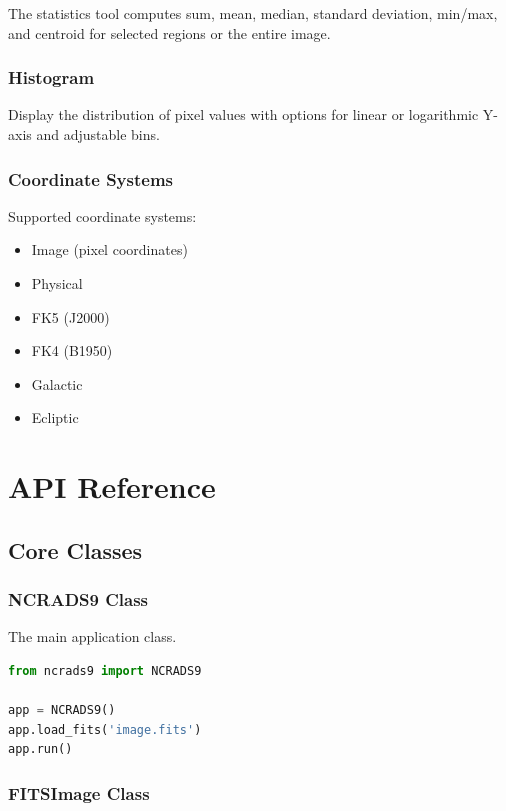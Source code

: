 \documentclass[11pt,a4paper]{report}
\begin{document}
The statistics tool computes sum, mean, median, standard deviation, min/max, and centroid for selected regions or the entire image.

\subsection{Histogram}

Display the distribution of pixel values with options for linear or logarithmic Y-axis and adjustable bins.

\subsection{Coordinate Systems}

Supported coordinate systems:
\begin{itemize}
    \item Image (pixel coordinates)
    \item Physical
    \item FK5 (J2000)
    \item FK4 (B1950)
    \item Galactic
    \item Ecliptic
\end{itemize}

\chapter{API Reference}

\section{Core Classes}

\subsection{NCRADS9 Class}

The main application class.

\begin{lstlisting}[language=Python]
from ncrads9 import NCRADS9

app = NCRADS9()
app.load_fits('image.fits')
app.run()
\end{lstlisting}

\subsection{FITSImage Class}
\end{document}
